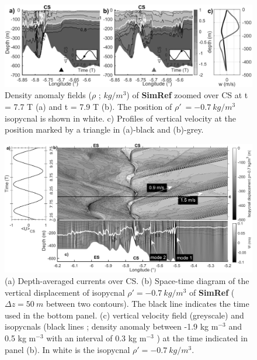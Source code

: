 \begin{figure}[!h]
\includegraphics[width=\textwidth]{./GBR2D/figure8.png}
  \caption[(a,b)Density anomaly fields zoomed over CS. (c) Profiles of vertical velocity.]{Density anomaly fields ($\rho$ ; $kg/m^3$) of \textbf{SimRef} zoomed over CS at t = 7.7 T (a) and t = 7.9 T (b). The position of $\rho'\ =-0.7\ kg/m^3$ isopycnal is shown in white. c) Profiles of vertical velocity at the position marked by a triangle in (a)-black and (b)-grey.}
  \label{fig_gen_CS}
  \end{figure}
  
\begin{figure}[!t]
\centering
\includegraphics[width=1\linewidth]{./GBR2D/figure9.png}
 \caption[(a) Currents over CS. (b) Space-time diagram of the vertical displacement of an isopycnal. (c) vertical velocity field and isopycnals.]{(a) Depth-averaged currents over CS. (b) Space-time diagram of the vertical displacement of isopycnal $\rho' = -0.7\ kg/m^3$ of \textbf{SimRef} ($\Delta z = 50\ m$ between two contours). The black line indicates the time used in the bottom panel. (c) vertical velocity field (greyscale) and isopycnals (black lines ; density anomaly between -1.9 kg m$^{-3}$ and 0.5 kg m$^{-3}$ with an interval of 0.3 kg m$^{-3}$ ) at the time indicated in panel (b). In white is the isopycnal $\rho' = -0.7\ kg/m^3 $.}
 \label{hov_ref}
\end{figure}

